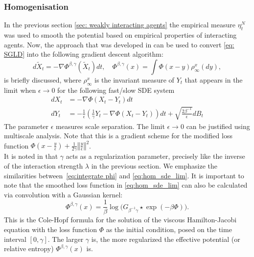 \documentclass{article}
\theoremstyle{mystyle}
\begin{document}
\subsubsection{Homogenisation}

In the previous section \ref{sec: weakly interacting agents} the empirical measure $\eta_{t}^{N}$ was used
to smooth the potential based on empirical properties of interacting
agents. Now, the approach that
was developed in \cite{Chaudhari2017DeepRP} can be used to convert \ref{eq: SGLD}
into the following gradient descent algorithm: 
\begin{equation}
d\tilde{X}_{t}=-\nabla\Phi^{\beta,\gamma}(\tilde{X}_{t})dt,\quad\Phi^{\beta,\gamma}\left(x\right)=\int\Phi(x-y)\rho_{\infty}^{x}(dy),\label{eq:hom_sde_lim}
\end{equation}
is briefly discussed, where $\rho_{\infty}^{x}$ is the invariant measure of $Y_{t}$ that
appears in the limit when $\epsilon\rightarrow0$ for the following
fast/slow SDE system \begin{subequations}\label{eq:hom_sde_v2} 
\begin{align}
dX_{t} & =-\nabla\Phi(X_{t}-Y_{t})dt\label{eq:hom_sde_v2_1}\\
dY_{t} & =-\frac{1}{\epsilon}\left(\frac{1}{\gamma}Y_{t}-\nabla\Phi(X_{t}-Y_{t})\right)dt+\sqrt{\frac{2\beta^{-1}}{\epsilon}}dB_{t}\label{eq:hom_sde_v2_2}
\end{align}
\end{subequations}The parameter $\epsilon$ measures scale separation.
The limit $\epsilon\rightarrow0$ can be justified using multiscale
analysis. Note that this is a gradient
scheme for the modified loss function $\Phi(x-\frac{y}{\epsilon})+\frac{1}{2\gamma}\left\Vert \frac{y}{\epsilon}\right\Vert ^{2}$.\\ 

It is noted in \cite{kantas2019sharpflatshallowweakly} that $\gamma$ acts as a regularization parameter, precisely like the inverse of the interaction strength $\lambda$
in the previous section. We emphasize the similarities between~\ref{eq:integrate phi}
and \ref{eq:hom_sde_lim}. It is important to note that the smoothed loss function in \ref{eq:hom_sde_lim}
can also be calculated via convolution with a Gaussian kernel: 
\begin{equation}
\Phi^{\beta,\gamma}(x)=\frac{1}{\beta}\log\Big(G_{\beta^{-1}\gamma}\star\exp(-\beta\Phi)\Big).\label{e:phi-cole-hopf}
\end{equation}
This is the Cole-Hopf formula for the solution of the viscous Hamilton-Jacobi
equation with the loss function $\Phi$ as the initial condition,
posed on the time interval $[0,\gamma]$. The larger $\gamma$ is,
the more regularized the effective potential (or relative entropy)
$\Phi^{\beta,\gamma}(x)$ is. \\ 
\end{document}
